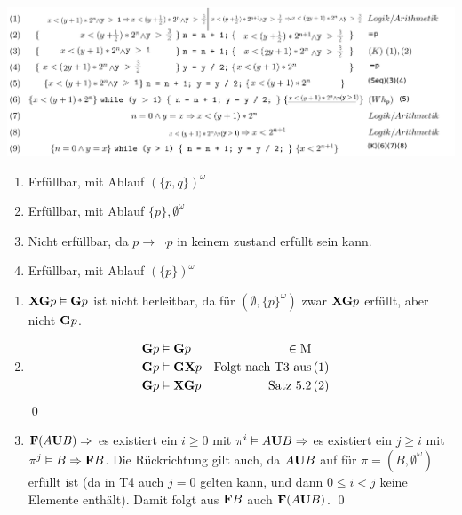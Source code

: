 


\date{Donnerstag 16.1.2020}


\maketitle
\thispagestyle{fancy}

\begin{center}
	\includegraphics[width=1\textwidth]{a1.png}
\end{center}


\begin{enumerate}[1.]
	\item Erfüllbar, mit Ablauf $(\{p,q\})^\omega$
	\item Erfüllbar, mit Ablauf $\{p\},\emptyset^\omega$
	\item Nicht erfüllbar, da $p \to \lnot p$ in keinem zustand erfüllt sein kann.
	\item Erfüllbar, mit Ablauf $(\{p\})^\omega$
\end{enumerate}


\begin{enumerate}[1.]
	\item $\mathbf{X}\mathbf{G} p \vDash \mathbf{G} p$ ist nicht herleitbar, da für $(\emptyset, \{p\}^\omega)$ zwar $\mathbf{X}\mathbf{G} p$ erfüllt, aber nicht $\mathbf{G} p$. 
	\item \begin{align}
		\mathbf{G} p & \vDash \mathbf{G} p   & \in \text{M} \\
		\mathbf{G} p & \vDash \mathbf{G}\mathbf{X} p & \text{Folgt nach T3 aus} & \, (1)\\
		\mathbf{G} p & \vDash \mathbf{X}\mathbf{G} p & \text{Satz 5.2}          & \, (2)
	\end{align}
	\qed
	\item $\mathbf{F}(A\mathbf{U} B) \Rightarrow$ es existiert ein $i\geq 0$ mit $\pi^i \vDash A\mathbf{U} B \Rightarrow$ es existiert ein 
	$j\geq i$ mit $\pi^j\vDash B \Rightarrow \mathbf{F} B$. Die Rückrichtung gilt auch, da $A\mathbf{U} B$ auf für 
	$\pi = ({B},\emptyset^\omega)$ erfüllt ist (da in T4 auch $j=0$ gelten kann, und dann $0\leq i < j$ keine Elemente 
	enthält). Damit folgt aus $\mathbf{F} B$ auch $\mathbf{F}(A\mathbf{U} B)$.
	\qed
\end{enumerate}

